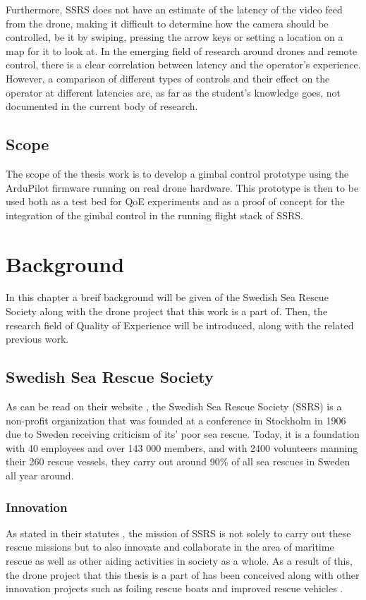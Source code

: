 \documentclass[nofilelist]{cslthse-msc}
\begin{document}
Furthermore, SSRS does not have an estimate of the latency of the video feed from the drone, making it difficult to determine how the camera should be controlled, be it by swiping, pressing the arrow keys or setting a location on a map for it to look at. In the emerging field of research around drones and remote control, there is a clear correlation between latency and the operator’s experience. However, a comparison of different types of controls and their effect on the operator at different latencies are, as far as the student’s knowledge goes, not documented in the current body of research.

\section{Scope}
The scope of the thesis work is to develop a gimbal control prototype using the ArduPilot firmware running on real drone hardware. This prototype is then to be used both as a test bed for QoE experiments and as a proof of concept for the integration of the gimbal control in the running flight stack of SSRS.

\chapter{Background}
In this chapter a breif background will be given of the Swedish Sea Rescue Society along with the drone project that this work is a part of. Then, the research field of Quality of Experience will be introduced, along with the related previous work.

\section{Swedish Sea Rescue Society}
As can be read on their website \cite{ssrs}, the Swedish Sea Rescue Society (SSRS) is a non-profit organization that was founded at a conference in Stockholm in 1906 due to Sweden receiving criticism of its' poor sea rescue. Today, it is a foundation with 40 employees and over 143 000 members, and with 2400 volunteers manning their 260 rescue vessels, they carry out around 90\% of all sea rescues in Sweden all year around.

\subsection{Innovation}
 As stated in their statutes \cite{ssrs-statues}, the mission of SSRS is not solely to carry out these rescue missions but to also innovate and collaborate in the area of maritime rescue as well as other aiding activities in society as a whole. As a result of this, the drone project that this thesis is a part of has been conceived along with other innovation projects such as foiling rescue boats and improved rescue vehicles \cite{surtsey-innovation}.
\end{document}

